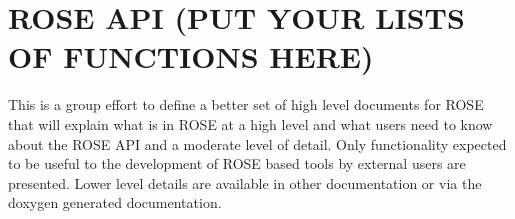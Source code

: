 \newpage


\section{ROSE API (PUT YOUR LISTS OF FUNCTIONS HERE)}

    This is a group effort to define a better set of high level documents for ROSE
that will explain what is in ROSE at a high level and what users need to know about the
ROSE API and a moderate level of detail.  Only functionality expected to be useful to the
development of ROSE based tools by external users are presented.  Lower level details are
available in other documentation or via the doxygen generated documentation.

